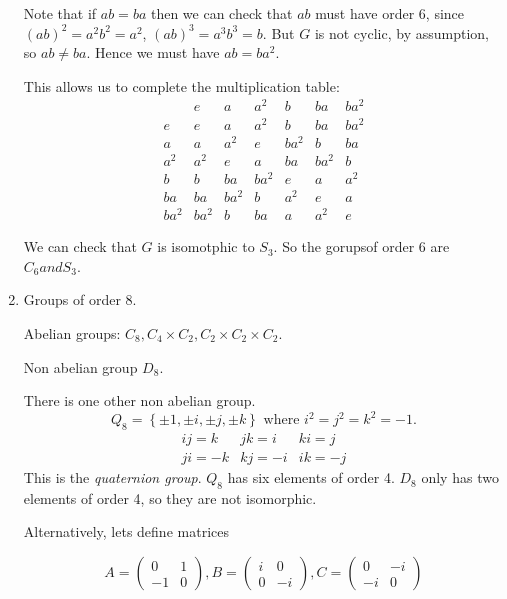 \documentclass{article}
\theoremstyle{definition}
\begin{document}
\begin{enumerate}
Note that if $ab=ba$ then we can check that $ab$ must have order 6, 
since $(ab)^2=a^2b^2=a^2$, $(ab)^3=a^3b^3=b.$ But $G$ is not cyclic, by assumption, so $ab\neq ba$.
Hence we must have $ab = ba^2$.

This allows us to complete the multiplication table:
\begin{equation}
  \begin{matrix}
     & e & a & a^2 & b & ba & ba^2 \\
   e & e & a & a^2 & b & ba & ba^2 \\
   a & a & a^2 & e & ba^2 & b & ba \\
   a^2 & a^2 & e & a & ba & ba^2 & b \\
   b & b & ba & ba^2 & e & a & a^2               \\
   ba & ba & ba^2 & b & a^2 & e & a            \\
   ba^2 & ba^2 & b & ba & a & a^2 & e
 \end{matrix}
\end{equation}

We can check that  $G$ is isomotphic to $S_3$. So the gorupsof order 6 are $C_6 and S_3$.

\item Groups of order 8.

  Abelian groups: $C_8,C_4\times C_2, C_2 \times C_2 \times C_2.$ 

  Non abelian group $D_8$.

  There is one other non abelian group.
  \begin{equation}
    Q_8 = \left\{ \pm1, \pm i, \pm j, \pm k \right\} \text{ where } i^2=j^2=k^2=-1.
    \label{}
  \end{equation}
  \begin{equation}
    \begin{matrix}
      ij=k & jk=i & ki=j \\
      ji=-k & kj=-i & ik=-j
    \end{matrix}
    \label{}
  \end{equation}
  This is the \emph{quaternion group}. 
  $Q_8$ has six elements of order 4. 
  $D_8$ only has two elements of order 4, so they are not isomorphic.

  Alternatively, lets define matrices

  \begin{equation*}
    A = \left( 
\begin{matrix}
  0 & 1 \\
  -1 & 0
\end{matrix} 
    \right),
   B = \left( 
   \begin{matrix}
     i & 0 \\
     0 & -i
   \end{matrix}
   \right),
   C = 
   \left( 
\begin{matrix}
  0 & -i \\
  -i & 0
\end{matrix}
   \right)
    \label{}
\end{equation*}


\end{enumerate}
\end{document}
